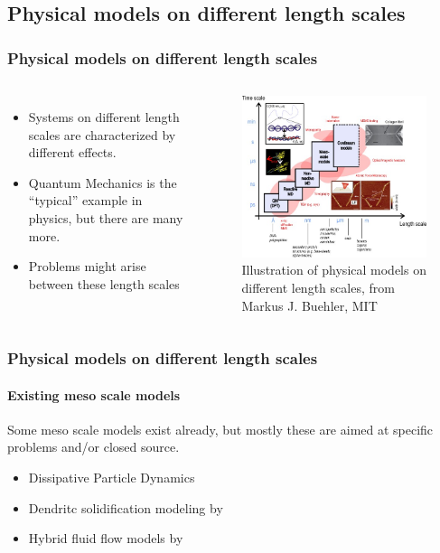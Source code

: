 \documentclass[12pt,a4paper, xcolor={usenames,dvipsnames,svgnames,table}]{beamer}
\begin{document}
\subsection{Physical models on different length scales}
\begin{frame}[shrink]
\frametitle{Physical models on different length scales}
\begin{columns}
\begin{itemize}
\item<2-> Systems on different length scales are characterized by different effects.
\item<3-> Quantum Mechanics is the ``typical'' example in physics, but there are many more.
\item<4-> Problems might arise between these length scales
\end{itemize}
\begin{figure}[H]
  \centering
  \includegraphics[width=\textwidth]{Figures/lengthscales.jpg}
  \caption{Illustration of physical models on different length scales, from  Markus J. Buehler, MIT}
 \end{figure}
\end{columns}
\end{frame}
\notetoself{}


\begin{frame}[shrink]
\frametitle{Physical models on different length scales}
\framesubtitle{Existing meso scale models}
Some meso scale models exist already, but mostly these are aimed at specific problems and/or closed source.
\begin{itemize}
 \item Dissipative Particle Dynamics
 \item Dendritc solidification modeling by 
 \item Hybrid fluid flow models by 
\end{itemize}
\end{frame}
\end{document}
